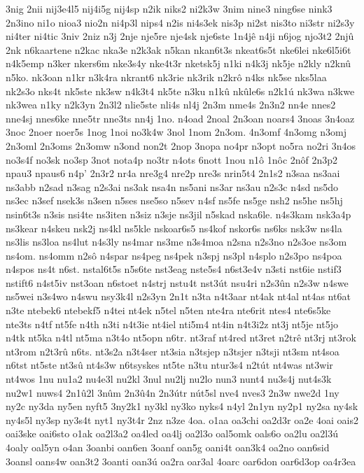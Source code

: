 {3nig
2nii
nij3e4l5
nij4i5g
nij4sp
n2ik
niks2
ni2k3w
3nim
nine3
ning6se
nink3
2n3ino
ni1o
nioa3
nio2n
ni4p3l
nips4
n2is
ni4s3ek
nis3p
ni2st
nis3to
ni3str
ni2s3y
ni4ter
ni4tic
3niv
2niz
n3j
2nje
nje5re
nje4sk
nje6ste
1n4jê
n4ji
n6jog
njo3t2
2njû
2nk
n6kaartene
n2kac
nka3e
n2k3ak
n5kan
nkan6t3s
nkeat6s5t
nke6lei
nke6l5i6t
n4k5emp
n3ker
nkers6m
nke3s4y
nke4t3r
nketsk5j
n1ki
n4k3j
nk5je
n2kly
n2knû
n5ko.
nk3oan
n1kr
n3k4ra
nkrant6
nk3rie
nk3rik
n2krô
n4ks
nk5se
nks5laa
nk2s3o
nks4t
nk5ste
nk3sw
n4k3t4
nk5te
n3ku
n1kû
nkûle6s
n2k1ú
nk3wa
n3kwe
nk3wea
n1ky
n2k3yn
2n3l2
nlie5ste
nli4s
nl4j
2n3m
nme4s
2n3n2
nn4e
nnes2
nne4sj
nnes6ke
nne5tr
nne3ts
nn4j
1no.
n4oad
2noal
2n3oan
noars4
3noas
3n4oaz
3noc
2noer
noer5s
1nog
1noi
no3k4w
3nol
1nom
2n3om.
4n3omf
4n3omg
n3omj
2n3oml
2n3oms
2n3omw
n3ond
non2t
2nop
3nopa
no4pr
n3opt
no5ra
no2ri
3n4os
no3s4f
no3sk
no3sp
3not
nota4p
no3tr
n4ots
6nott
1nou
n1ô
1nôc
2nôf
2n3p2
npau3
npaus6
n4p'
2n3r2
nr4a
nre3g4
nre2p
nre3s
nrin5t4
2n1s2
n3saa
ns3aai
ns3abb
n2sad
n3sag
n2s3ai
ns3ak
nsa4n
ns5ani
ns3ar
ns3au
n2s3c
n4sd
ns5do
ns3ec
n3sef
nsek3s
n3sen
n5ses
nse5so
n5sev
n4sf
ns5fe
ns5ge
nsh2
ns5he
ns5hj
nsin6t3s
n3sis
nsi4te
ns3iten
n3siz
n3sje
ns3jil
n5skad
nska6le.
n4s3kam
nsk3a4p
ns3kear
n4skeu
nsk2j
ns4kl
ns5kle
nskoar6s5
ns4kof
nskor6s
ns6ks
nsk3w
ns4la
ns3lis
ns3loa
ns4lut
n4s3ly
ns4mar
ns3me
n3s4moa
n2sna
n2s3no
n2s3oe
ns3om
ns4om.
ns4omm
n2sô
n4spar
ns4peg
ns4pek
n3spj
ns3pl
n4splo
n2s3po
ns4poa
n4spos
ns4t
n6st.
nstal6t5s
n5s6te
nst3eag
nste5s4
n6st3e4v
n3sti
nst6ie
nstif3
nstift6
n4st5iv
nst3oan
n6stoet
n4strj
nstu4t
nst3út
nsu4ri
n2s3ûn
n2s3w
n4swe
ns5wei
n3s4wo
n4swu
nsy3k4l
n2s3yn
2n1t
n3ta
n4t3aar
nt4ak
nt4al
nt4as
nt6at
n3te
ntebek6
ntebekf5
n4tei
nt4ek
n5tel
n5ten
nte4ra
nte6rit
ntes4
nte6s5ke
nte3ts
n4tf
nt5fe
n4th
n3ti
n4t3ie
nt4iel
nti5m4
nt4in
n4t3i2z
nt3j
nt5je
nt5jo
n4tk
nt5ka
n4tl
nt5ma
n3t4o
nt5opn
n6tr.
nt3raf
nt4red
nt3ret
n2trê
nt3rj
nt3rok
nt3rom
n2t3rû
n6ts.
nt3s2a
n3t4ser
nt3sia
n3tsjep
n3tsjer
n3tsji
nt3sm
nt4soa
n6tst
nt5ste
nt3sû
nt4s3w
n6tsyskes
nt5te
n3tu
ntur3s4
n2tút
nt4was
nt3wir
nt4wos
1nu
nu1a2
nu4e3l
nu2kl
3nul
nu2lj
nu2lo
nun3
nunt4
nu3s4j
nut4s3k
nu2w1
nuws4
2n1û2l
3nûm
2n3û4n
2n3útr
nút5sl
nve4
nves3
2n3w
nwe2d
1ny
ny2c
ny3da
ny5en
nyft5
3ny2k1
ny3kl
ny3ko
nyks4
n4yl
2n1yn
ny2p1
ny2sa
ny4sk
ny4s5l
ny3sp
ny3s4t
nyt1
ny3t4r
2nz
n3ze
4oa.
o1aa
oa3chi
oa2d3r
oa2e
4oai
oais2
oai3ske
oai6sto
o1ak
oa2l3a2
oa4led
oa4lj
oa2l3o
oal5omk
oals6o
oa2lu
oa2l3ú
4oaly
oal5yn
o4an
3oanbi
oan6en
3oanf
oan5g
oani4t
oan3k4
oa2no
oan6sid
3oansl
oans4w
oan3t2
3oanti
oan3ú
oa2ra
oar3al
4oarc
oar6don
oar6d3op
oa4r3ea
}

